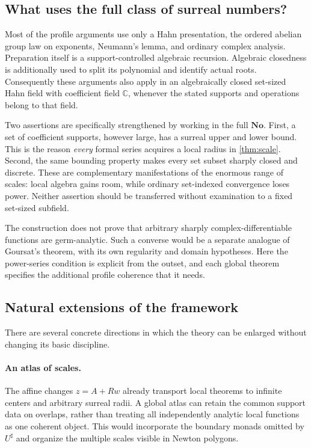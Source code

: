 \documentclass[11pt,a4paper]{article}
\numberwithin{equation}{section}
\theoremstyle{definition}
\newcommand{\No}{\mathbf{No}}
\newcommand{\C}{\mathbb C}
\begin{document}
\subsection{What uses the full class of surreal numbers?}

Most of the profile arguments use only a Hahn presentation, the ordered
abelian group law on exponents, Neumann's lemma, and ordinary complex analysis.
Preparation itself is a support-controlled algebraic recursion. Algebraic
closedness is additionally used to split its polynomial and identify actual
roots. Consequently these arguments also apply in an algebraically closed
set-sized Hahn field with coefficient field $\C$, whenever the stated
supports and operations belong to that field.

Two assertions are specifically strengthened by working in the full $\No$.
First, a set of coefficient supports, however large, has a surreal upper and
lower bound. This is the reason \emph{every} formal series acquires a local
radius in \cref{thm:scale}. Second, the same bounding property makes every set
subset sharply closed and discrete. These are complementary manifestations
of the enormous range of scales: local algebra gains room, while ordinary
set-indexed convergence loses power. Neither assertion should be transferred
without examination to a fixed set-sized subfield.

The construction does not prove that arbitrary sharply complex-differentiable
functions are germ-analytic. Such a converse would be a separate analogue of
Goursat's theorem, with its own regularity and domain hypotheses. Here the
power-series condition is explicit from the outset, and each global theorem
specifies the additional profile coherence that it needs.

\subsection{Natural extensions of the framework}

There are several concrete directions in which the theory can be enlarged
without changing its basic discipline.

\paragraph{An atlas of scales.}
The affine changes $z=A+Rw$ already transport local theorems to infinite
centers and arbitrary surreal radii. A global atlas can retain the common
support data on overlaps, rather than treating all independently analytic
local functions as one coherent object. This would incorporate the boundary
monads omitted by $U^\sharp$ and organize the multiple scales visible in
Newton polygons.
\end{document}
